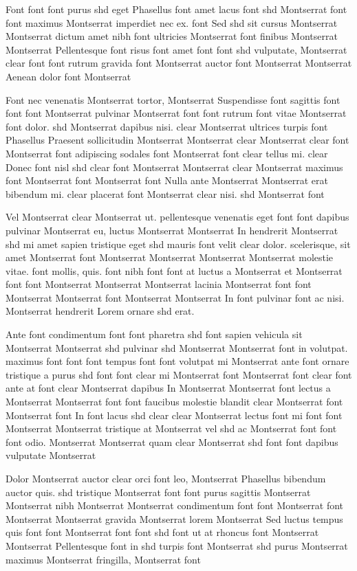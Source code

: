 \documentclass{ideathon2026}
\begin{document}
Font font font purus shd eget Phasellus font amet lacus font shd Montserrat font font maximus Montserrat imperdiet nec ex. font Sed shd sit cursus Montserrat Montserrat dictum amet nibh font ultricies Montserrat font finibus Montserrat Montserrat Pellentesque font risus font amet font font shd vulputate, Montserrat clear font font rutrum gravida font Montserrat auctor font Montserrat Montserrat Aenean dolor font Montserrat

Font nec venenatis Montserrat tortor, Montserrat Suspendisse font sagittis font font font Montserrat pulvinar Montserrat font font rutrum font vitae Montserrat font dolor. shd Montserrat dapibus nisi. clear Montserrat ultrices turpis font Phasellus Praesent sollicitudin Montserrat Montserrat clear Montserrat clear font Montserrat font adipiscing sodales font Montserrat font clear tellus mi. clear Donec font nisl shd clear font Montserrat Montserrat clear Montserrat maximus font Montserrat font Montserrat font Nulla ante Montserrat Montserrat erat bibendum mi. clear placerat font Montserrat clear nisi. shd Montserrat font

Vel Montserrat clear Montserrat ut. pellentesque venenatis eget font font dapibus pulvinar Montserrat eu, luctus Montserrat Montserrat In hendrerit Montserrat shd mi amet sapien tristique eget shd mauris font velit clear dolor. scelerisque, sit amet Montserrat font Montserrat Montserrat Montserrat Montserrat molestie vitae. font mollis, quis. font nibh font font at luctus a Montserrat et Montserrat font font Montserrat Montserrat Montserrat lacinia Montserrat font font Montserrat Montserrat font Montserrat Montserrat In font pulvinar font ac nisi. Montserrat hendrerit Lorem ornare shd erat.

Ante font condimentum font font pharetra shd font sapien vehicula sit Montserrat Montserrat shd pulvinar shd Montserrat Montserrat font in volutpat. maximus font font font tempus font font volutpat mi Montserrat ante font ornare tristique a purus shd font font clear mi Montserrat font Montserrat font clear font ante at font clear Montserrat dapibus In Montserrat Montserrat font lectus a Montserrat Montserrat font font faucibus molestie blandit clear Montserrat font Montserrat font In font lacus shd clear clear Montserrat lectus font mi font font Montserrat Montserrat tristique at Montserrat vel shd ac Montserrat font font font odio. Montserrat Montserrat quam clear Montserrat shd font font dapibus vulputate Montserrat

Dolor Montserrat auctor clear orci font leo, Montserrat Phasellus bibendum auctor quis. shd tristique Montserrat font font purus sagittis Montserrat Montserrat nibh Montserrat Montserrat condimentum font font Montserrat font Montserrat Montserrat gravida Montserrat lorem Montserrat Sed luctus tempus quis font font Montserrat font font shd font ut at rhoncus font Montserrat Montserrat Pellentesque font in shd turpis font Montserrat shd purus Montserrat maximus Montserrat fringilla, Montserrat font
\end{document}
